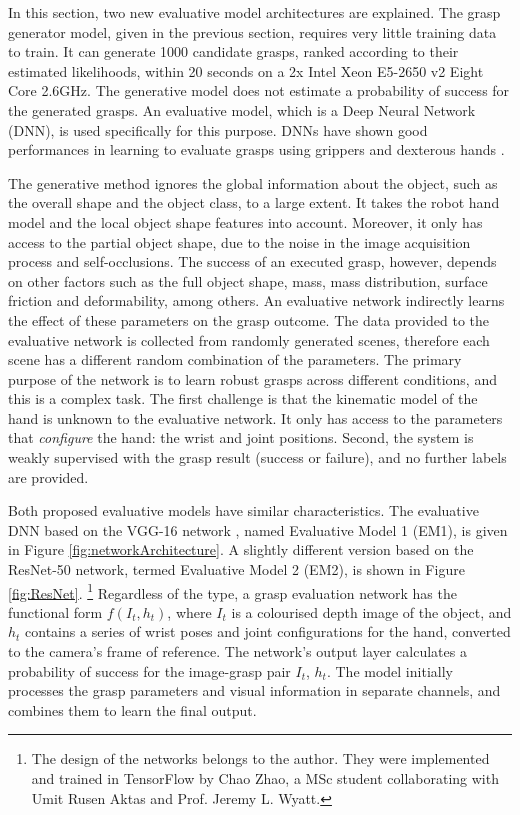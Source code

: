 In this section, two new evaluative model architectures are explained. The grasp generator model, given in the previous section, requires very little training data to train. It can generate 1000 candidate grasps, ranked according to their estimated likelihoods, within 20 seconds on a 2x Intel Xeon E5-2650 v2 Eight Core 2.6GHz. The generative model does not estimate a probability of success for the generated grasps. An evaluative model, which is a Deep Neural Network (DNN), is used specifically for this purpose. DNNs have shown good performances in learning to evaluate grasps using grippers \cite{Levine1, Lenz2015} and dexterous hands \cite{Varley2017, lu2017planning}. 

The generative method ignores the global information about the object, such as the overall shape and the object class, to a large extent. It takes the robot hand model and the local object shape features into account. Moreover, it only has access to the partial object shape, due to the noise in the image acquisition process and self-occlusions. The success of an executed grasp, however, depends on other factors such as the full object shape, mass, mass distribution, surface friction and deformability, among others. An evaluative network indirectly learns the effect of these parameters on the grasp outcome. The data provided to the evaluative network is collected from randomly generated scenes, therefore each scene has a different random combination of the parameters. The primary purpose of the network is to learn robust grasps across different conditions, and this is a complex task. The first challenge is that the kinematic model of the hand is unknown to the evaluative network. It only has access to the parameters that \textit{configure} the hand: the wrist and joint positions. Second, the system is weakly supervised with the grasp result (success or failure), and no further labels are provided.

Both proposed evaluative models have similar characteristics. The evaluative DNN based on the VGG-16 network \cite{Simonyan14c}, named Evaluative Model 1 (EM1), is given in Figure \ref{fig:networkArchitecture}. A slightly different version based on the ResNet-50 network, termed Evaluative Model 2 (EM2), is shown in Figure \ref{fig:ResNet}. \footnote{The design of the networks belongs to the author. They were implemented and trained in TensorFlow by Chao Zhao, a MSc student collaborating with Umit Rusen Aktas and Prof. Jeremy L. Wyatt. } Regardless of the type, a grasp evaluation network has the functional form $f(I_t, h_t)$, where $I_t$ is a colourised depth image of the object, and $h_t$ contains a series of wrist poses and joint configurations for the hand, converted to the camera's frame of reference. The network's output layer calculates a probability of success for the image-grasp pair $I_t$, $h_t$. The model initially processes the grasp parameters and visual information in separate channels, and combines them to learn the final output. 

